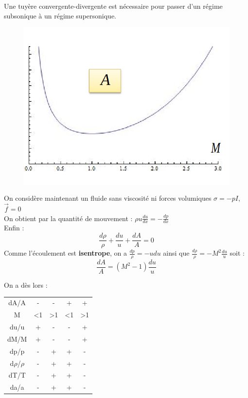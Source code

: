 \documentclass[../main.tex]{subfiles}
\begin{document}
Une tuyère convergente-divergente est nécessaire pour passer d'un régime subsonique à un régime supersonique.\\

\begin{figure}[hbt!]
    \centering
    \includegraphics[width = .5\textwidth]{IMAGES/machineelec/aire.png}
\end{figure}

On considère maintenant un fluide sans viscosité ni forces volumiques $\sigma = -pI$, $\Vec{f} = 0$\\

On obtient par la quantité de mouvement : $\rho u \frac{du}{dx} = -\frac{dp}{dx}$\\

Enfin : \begin{equation}
    \frac{d\rho}{\rho} + \frac{du}{u} + \frac{dA}{A} = 0
\end{equation}
Comme l'écoulement est \textbf{isentrope}, on a $\frac{dp}{\rho} = -udu$ ainsi que $\frac{d\rho}{\rho} = -M^2 \frac{du}{u}$ soit : \begin{equation}
    \frac{dA}{A} = (M^2-1)\frac{du}{u}
\end{equation}

On a dès lors : \begin{table}[hbt!]
    \centering
    \begin{tabular}{ccccc}
    \hline
        dA/A & - & - & + & + \\
        M & <1 & >1 & <1 & >1\\
        \hline
        du/u & + & - & - & +\\
        dM/M & + & - & - & +\\
        \hline
        dp/p & - & +& + & -\\
        d$\rho$/$\rho$ & - & + & + & -\\
        dT/T & -& + & + &-\\
        da/a & - & + & + &-\\
    \end{tabular}
\end{table}
\end{document}
